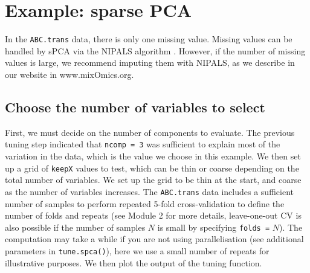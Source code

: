 \documentclass[]{book}
\newenvironment{Shaded}{\begin{snugshade}}{\end{snugshade}}
\newcommand{\KeywordTok}[1]{\textcolor[rgb]{0.13,0.29,0.53}{\textbf{#1}}}
\newcommand{\DataTypeTok}[1]{\textcolor[rgb]{0.13,0.29,0.53}{#1}}
\newcommand{\DecValTok}[1]{\textcolor[rgb]{0.00,0.00,0.81}{#1}}
\newcommand{\StringTok}[1]{\textcolor[rgb]{0.31,0.60,0.02}{#1}}
\newcommand{\CommentTok}[1]{\textcolor[rgb]{0.56,0.35,0.01}{\textit{#1}}}
\newcommand{\OperatorTok}[1]{\textcolor[rgb]{0.81,0.36,0.00}{\textbf{#1}}}
\newcommand{\NormalTok}[1]{#1}
\begin{document}
\section{Example: sparse PCA}\label{spca:ex}

In the \texttt{ABC.trans} data, there is only one missing value. Missing
values can be handled by sPCA via the NIPALS algorithm . However, if the
number of missing values is large, we recommend imputing them with
NIPALS, as we describe in our website in www.mixOmics.org.

\subsection{Choose the number of variables to select}\label{tuning-spca}

First, we must decide on the number of components to evaluate. The
previous tuning step indicated that \texttt{ncomp\ =\ 3} was sufficient
to explain most of the variation in the data, which is the value we
choose in this example. We then set up a grid of \texttt{keepX} values
to test, which can be thin or coarse depending on the total number of
variables. We set up the grid to be thin at the start, and coarse as the
number of variables increases. The \texttt{ABC.trans} data includes a
sufficient number of samples to perform repeated 5-fold cross-validation
to define the number of folds and repeats (see Module 2 for more
details, leave-one-out CV is also possible if the number of samples
\(N\) is small by specifying \texttt{folds\ =} \(N\)). The computation
may take a while if you are not using parallelisation (see additional
parameters in \texttt{tune.spca()}), here we use a small number of
repeats for illustrative purposes. We then plot the output of the tuning
function.

\begin{Shaded}
\end{Shaded}
\end{document}
